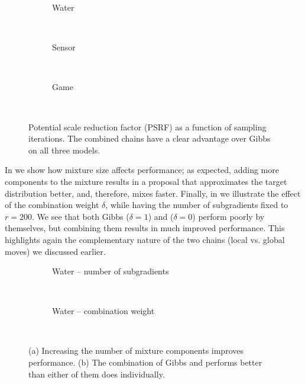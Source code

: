 \setlength{}
\setlength{}
\renewcommand{\subflen}{1.0\textwidth}
\begin{figure}[htbp]
  \begin{subfigure}[b]{\subflen}
    \centering
    
    \vspace{-0.5em}
    \caption{\textsf{Water}}
    \label{fig:water1}
  \end{subfigure}\\[1em]
  \begin{subfigure}[b]{\subflen}
    \centering
    
    \vspace{-0.5em}
    \caption{\textsf{Sensor}}
    \label{fig:berkeley1}
  \end{subfigure}\\[1em]
  \begin{subfigure}[b]{\subflen}
    \centering
    
    \vspace{-0.5em}
    \caption{\textsf{Game}}
    \label{fig:hots1}
  \end{subfigure}\\[-0.5em]
  \caption{
    Potential scale reduction factor (PSRF) as a function of sampling iterations.
    The combined chains have a clear advantage over Gibbs on all three models.
    }
  \label{fig:expsamples}
\end{figure}

In  we show how mixture size affects performance; as expected, adding more components to the mixture results in a proposal that approximates the target distribution better, and, therefore, mixes faster.
Finally, in  we illustrate the effect of the combination weight $\delta$, while having the number of subgradients fixed to $r = 200$.
We see that both Gibbs ($\delta = 1$) and \Ms{} ($\delta = 0$) perform poorly by themselves, but combining them results in much improved performance.
This highlights again the complementary nature of the two chains (local vs. global moves) we discussed earlier.

\setlength{}
\setlength{}
\renewcommand{\subflen}{\textwidth}
\begin{figure}[htbp]
  \begin{subfigure}[b]{\subflen}
    \centering
    
    \caption{\textsf{Water} -- number of subgradients}
    \label{fig:water2}
  \end{subfigure}\\[2em]
  \begin{subfigure}[b]{\subflen}
    \centering
    
    \caption{\textsf{Water} -- combination weight}
    \label{fig:water3}
  \end{subfigure}\\
  \caption{
    (a) Increasing the number of mixture components improves performance.
    (b) The combination of Gibbs and \Ms{} performs better than either of them does individually.
  }
  \label{fig:exp2}
\end{figure}


